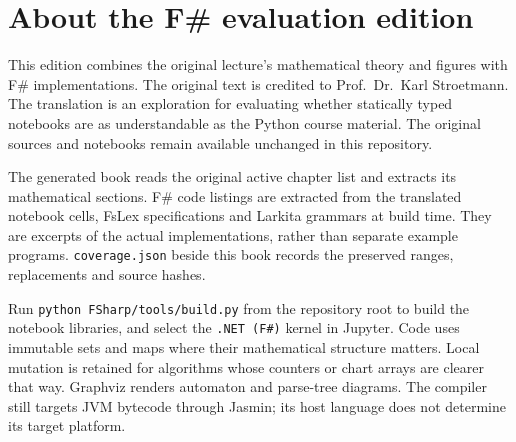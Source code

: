 \chapter*{About the F\# evaluation edition}
This edition combines the original lecture's mathematical theory and figures with F\# implementations.
The original text is credited to Prof.~Dr.~Karl Stroetmann.
The translation is an exploration for evaluating whether statically typed notebooks are as understandable as the Python course material.
The original sources and notebooks remain available unchanged in this repository.

The generated book reads the original active chapter list and extracts its mathematical sections.
F\# code listings are extracted from the translated notebook cells, FsLex specifications and Larkita grammars at build time.
They are excerpts of the actual implementations, rather than separate example programs.
\texttt{coverage.json} beside this book records the preserved ranges, replacements and source hashes.

Run \texttt{python FSharp/tools/build.py} from the repository root to build the notebook libraries, and select the \texttt{.NET (F\#)} kernel in Jupyter.
Code uses immutable sets and maps where their mathematical structure matters.
Local mutation is retained for algorithms whose counters or chart arrays are clearer that way.
Graphviz renders automaton and parse-tree diagrams.
The compiler still targets JVM bytecode through Jasmin; its host language does not determine its target platform.
